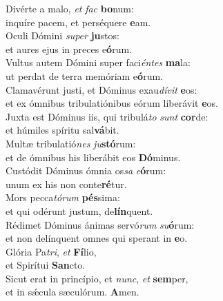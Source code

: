 \evenverse Divérte a malo, \textit{et} \textit{fac} \textbf{bo}num:~\*\\
\evenverse inquíre pacem, et perséquere \textbf{e}am.\\
\oddverse Oculi Dómini \textit{su}\textit{per} \textbf{ju}stos:~\*\\
\oddverse et aures ejus in preces e\textbf{ó}rum.\\
\evenverse Vultus autem Dómini super faci\textit{én}\textit{tes} \textbf{ma}la:~\*\\
\evenverse ut perdat de terra memóriam e\textbf{ó}rum.\\
\oddverse Clamavérunt justi, et Dóminus exau\textit{dí}\textit{vit} \textbf{e}os:~\*\\
\oddverse et ex ómnibus tribulatiónibus eórum liberávit \textbf{e}os.\\
\evenverse Juxta est Dóminus iis, qui tribulá\textit{to} \textit{sunt} \textbf{cor}de:~\*\\
\evenverse et húmiles spíritu sal\textbf{vá}bit.\\
\oddverse Multæ tribulatió\textit{nes} \textit{ju}\textbf{stó}rum:~\*\\
\oddverse et de ómnibus his liberábit eos \textbf{Dó}minus.\\
\evenverse Custódit Dóminus ómnia os\textit{sa} \textit{e}\textbf{ó}rum:~\*\\
\evenverse unum ex his non conte\textbf{ré}tur.\\
\oddverse Mors pecca\textit{tó}\textit{rum} \textbf{pés}sima:~\*\\
\oddverse et qui odérunt justum, de\textbf{lín}quent.\\
\evenverse Rédimet Dóminus ánimas servó\textit{rum} \textit{su}\textbf{ó}rum:~\*\\
\evenverse et non delínquent omnes qui sperant in \textbf{e}o.\\
\oddverse Glória Pa\textit{tri}, \textit{et} \textbf{Fí}lio,~\*\\
\oddverse et Spirítui \textbf{San}cto.\\
\evenverse Sicut erat in princípio, et \textit{nunc}, \textit{et} \textbf{sem}per,~\*\\
\evenverse et in sǽcula sæculórum. \textbf{A}men.\\
